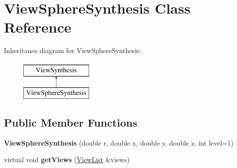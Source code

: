\hypertarget{classViewSphereSynthesis}{}\section{View\+Sphere\+Synthesis Class Reference}
\label{classViewSphereSynthesis}
Inheritance diagram for View\+Sphere\+Synthesis\+:\begin{figure}[H]
\begin{center}
\leavevmode
\includegraphics[height=2.000000cm]{classViewSphereSynthesis}
\end{center}
\end{figure}
\subsection*{Public Member Functions}
\begin{DoxyCompactItemize}
\item 
{\bfseries View\+Sphere\+Synthesis} (double r, double x, double y, double z, int level=1)\hypertarget{classViewSphereSynthesis_a840f30a912c0bf9c79b31b337561fbc4}{}\label{classViewSphereSynthesis_a840f30a912c0bf9c79b31b337561fbc4}

\item 
virtual void {\bfseries get\+Views} (\hyperlink{classViewList}{View\+List} \&views)\hypertarget{classViewSphereSynthesis_aa3d9003ac3ebe5ee344d287f2390baa1}{}\label{classViewSphereSynthesis_aa3d9003ac3ebe5ee344d287f2390baa1}

\end{DoxyCompactItemize}
